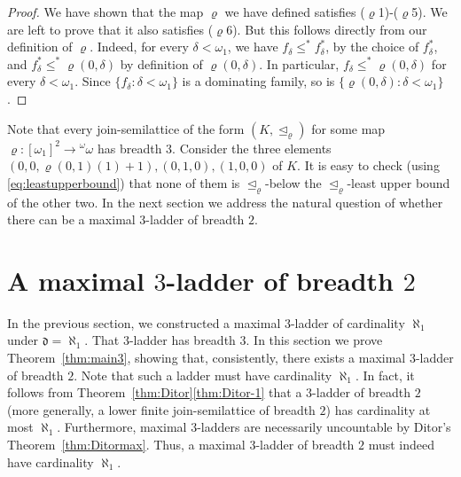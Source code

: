 \documentclass[]{amsart}
\theoremstyle{definition}
\theoremstyle{remark}
\begin{document}
\begin{proof}
We have shown that the map $\varrho$ we have defined satisfies ($\varrho$1)-($\varrho$5). We are left to prove that it also satisfies ($\varrho$6). But this follows directly from our definition of $\varrho$. Indeed, for every $\delta < \omega_1$, we have $f_\delta \le^* f^*_\delta$, by the choice of $f^*_\delta$, and $f^*_\delta \le^* \varrho(0, \delta)$ by definition of $\varrho(0, \delta)$. In particular, $f_\delta \le^* \varrho(0, \delta)$ for every $\delta < \omega_1$. Since $\{f_\delta : \delta < \omega_1\}$ is a dominating family, so is $\{\varrho(0, \delta) : \delta < \omega_1\}$. 
\end{proof}

Note that every join-semilattice of the form $(K, \trianglelefteq_\varrho)$ for some map $\varrho:[\omega_1]^2 \rightarrow {}^\omega \omega$ has breadth $3$. Consider the three elements $(0, 0, \varrho(0,1)(1)+1), (0, 1, 0), (1,0, 0)$  of $K$. It is easy to check (using \eqref{eq:leastupperbound}) that none of them is $\trianglelefteq_\varrho$-below  the $\trianglelefteq_\varrho$-least upper bound of the other two. In the next section we address the natural question of whether there can be a maximal $3$-ladder of breadth $2$. 


\section{A maximal $3$-ladder of breadth $2$}\label{sec:club}

In the previous section, we constructed a maximal $3$-ladder of cardinality $\aleph_1$ under $\mathfrak{d} = \aleph_1$. That $3$-ladder has breadth $3$. In this section we prove Theorem~\ref{thm:main3}, showing that, consistently, there exists a maximal $3$-ladder of breadth $2$. Note that such a ladder must have cardinality $\aleph_1$. In fact, it follows from Theorem~\ref{thm:Ditor}\ref{thm:Ditor-1} that a $3$-ladder of breadth $2$ (more generally, a lower finite join-semilattice of breadth $2$) has cardinality at most $\aleph_1$. Furthermore, maximal $3$-ladders are necessarily uncountable by Ditor's Theorem~\ref{thm:Ditormax}. Thus, a maximal $3$-ladder of breadth $2$ must indeed have cardinality $\aleph_1$.
\end{document}
